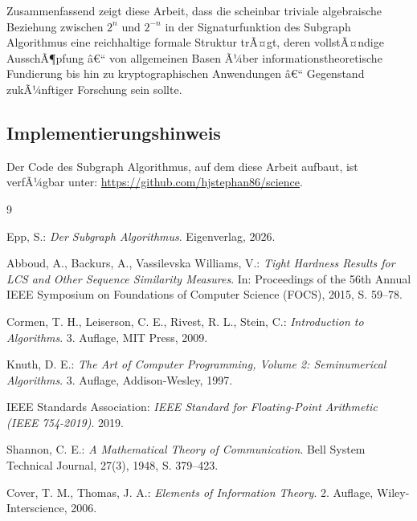 ﻿\documentclass[a4paper,12pt]{article}
\theoremstyle{definition}
\begin{document}
Zusammenfassend zeigt diese Arbeit, dass die scheinbar triviale
algebraische Beziehung zwischen $2^n$ und $2^{-n}$ in der Signaturfunktion
des Subgraph Algorithmus eine reichhaltige formale Struktur trÃ¤gt, deren
vollstÃ¤ndige AusschÃ¶pfung â€“ von allgemeinen Basen Ã¼ber
informationstheoretische Fundierung bis hin zu kryptographischen
Anwendungen â€“ Gegenstand zukÃ¼nftiger Forschung sein sollte.

\subsection{Implementierungshinweis}

Der Code des Subgraph Algorithmus, auf dem diese Arbeit aufbaut, ist
verfÃ¼gbar unter: \url{https://github.com/hjstephan86/science}.

\begin{thebibliography}{9}

Epp, S.: \emph{Der Subgraph Algorithmus}. Eigenverlag, 2026.

Abboud, A., Backurs, A., Vassilevska Williams, V.:
\emph{Tight Hardness Results for LCS and Other Sequence Similarity Measures}.
In: Proceedings of the 56th Annual IEEE Symposium on Foundations of
Computer Science (FOCS), 2015, S. 59--78.

Cormen, T. H., Leiserson, C. E., Rivest, R. L., Stein, C.:
\emph{Introduction to Algorithms}. 3. Auflage, MIT Press, 2009.

Knuth, D. E.: \emph{The Art of Computer Programming, Volume 2:
Seminumerical Algorithms}. 3. Auflage, Addison-Wesley, 1997.

IEEE Standards Association: \emph{IEEE Standard for Floating-Point
Arithmetic (IEEE 754-2019)}. 2019.

Shannon, C. E.: \emph{A Mathematical Theory of Communication}.
Bell System Technical Journal, 27(3), 1948, S. 379--423.

Cover, T. M., Thomas, J. A.: \emph{Elements of Information Theory}.
2. Auflage, Wiley-Interscience, 2006.

\end{thebibliography}
\end{document}
